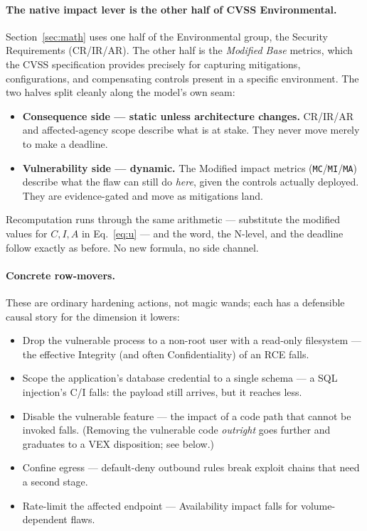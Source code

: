 \documentclass[11pt]{article}
\newcommand{\code}[1]{\texttt{#1}}
\begin{document}
\paragraph{The native impact lever is the other half of CVSS Environmental.}
Section~\ref{sec:math}
uses one half of the Environmental group, the Security Requirements (CR/IR/AR). The
other half is the \emph{Modified Base} metrics, which the CVSS specification provides
precisely for capturing mitigations, configurations, and compensating controls
present in a specific environment. The two halves split cleanly along the model's
own seam:
\begin{itemize}[leftmargin=1.4em,nosep,topsep=3pt]
\item \textbf{Consequence side --- static unless architecture changes.} CR/IR/AR
  and affected-agency scope describe what is at stake. They never move merely to
  make a deadline.
\item \textbf{Vulnerability side --- dynamic.} The Modified impact metrics
  (\code{MC}/\code{MI}/\code{MA}) describe what the flaw can still do \emph{here},
  given the controls actually deployed. They are evidence-gated and move as
  mitigations land.
\end{itemize}
Recomputation runs through the same arithmetic --- substitute the modified values
for $C,I,A$ in Eq.~\eqref{eq:u} --- and the word, the N-level, and the deadline
follow exactly as before. No new formula, no side channel.

\paragraph{Concrete row-movers.} These are ordinary hardening actions, not magic
wands; each has a defensible causal story for the dimension it lowers:
\begin{itemize}[leftmargin=1.4em,nosep,topsep=3pt]
\item Drop the vulnerable process to a non-root user with a read-only filesystem ---
  the effective Integrity (and often Confidentiality) of an RCE falls.
\item Scope the application's database credential to a single schema --- a SQL
  injection's C/I falls: the payload still arrives, but it reaches less.
\item Disable the vulnerable feature --- the impact of a code path that cannot be
  invoked falls. (Removing the vulnerable code \emph{outright} goes further and
  graduates to a VEX disposition; see below.)
\item Confine egress --- default-deny outbound rules break exploit chains that
  need a second stage.
\item Rate-limit the affected endpoint --- Availability impact falls for
  volume-dependent flaws.
\end{itemize}
\end{document}
